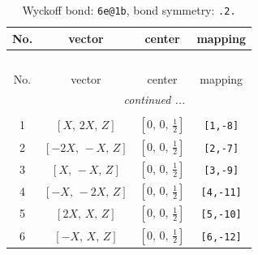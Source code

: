 \documentclass[fleqn,8pt]{jsarticle}
\begin{document}
\renewcommand{\arraystretch}{1.2}
\begin{longtable}{cccc}
\caption{Wyckoff bond: {\tt 6e@1b}, bond symmetry: {\tt .2.}}
 \\
 \hline \hline
No. & vector & center & mapping \\ \hline \endfirsthead

\multicolumn{3}{l}{\tablename\ \thetable{}} \\
 \hline \hline
No. & vector & center & mapping \\ \hline \endhead

 \hline \hline
\multicolumn{3}{r}{\footnotesize\it continued ...} \\ \endfoot

 \hline \hline
\multicolumn{3}{r}{} \\ \endlastfoot

1 & $\left[ X,\, 2 X,\, Z \right]$ & $\left[ 0,\, 0,\, \frac{1}{2} \right]$ & {\tt [1,-8]} \\ \hline
2 & $\left[ - 2 X,\, - X,\, Z \right]$ & $\left[ 0,\, 0,\, \frac{1}{2} \right]$ & {\tt [2,-7]} \\ \hline
3 & $\left[ X,\, - X,\, Z \right]$ & $\left[ 0,\, 0,\, \frac{1}{2} \right]$ & {\tt [3,-9]} \\ \hline
4 & $\left[ - X,\, - 2 X,\, Z \right]$ & $\left[ 0,\, 0,\, \frac{1}{2} \right]$ & {\tt [4,-11]} \\ \hline
5 & $\left[ 2 X,\, X,\, Z \right]$ & $\left[ 0,\, 0,\, \frac{1}{2} \right]$ & {\tt [5,-10]} \\ \hline
6 & $\left[ - X,\, X,\, Z \right]$ & $\left[ 0,\, 0,\, \frac{1}{2} \right]$ & {\tt [6,-12]} \\
\end{longtable}
\renewcommand{\arraystretch}{1.2}
\end{document}
